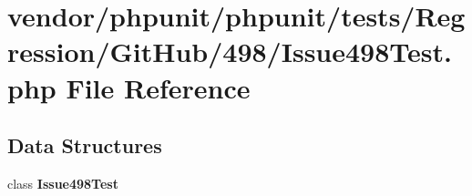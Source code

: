 \section{vendor/phpunit/phpunit/tests/\+Regression/\+Git\+Hub/498/\+Issue498\+Test.php File Reference}
\label{_issue498_test_8php}
\subsection*{Data Structures}
\begin{DoxyCompactItemize}
\item 
class {\bf Issue498\+Test}
\end{DoxyCompactItemize}
